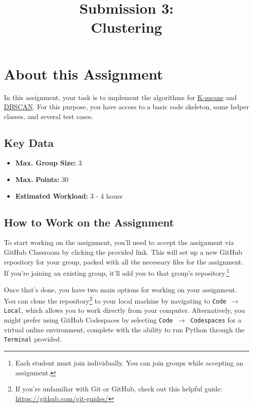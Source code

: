 \documentclass[
english,
smallborders
]{i6prcsht}
\begin{document}
\title{Submission 3: \\ Clustering}
\maketitle
\vspace*{-2cm}

\section*{About this Assignment}

In this assignment, your task is to implement the algorithms for \hyperref[sec:task-one]{K-means} and \hyperref[sec:task-two]{DBSCAN}. For this purpose, you have access to a basic code skeleton, some helper classes, and several test cases.

\subsection*{Key Data}

\begin{itemize}
	\item \textbf{Max. Group Size:} 3
	\item \textbf{Max. Points:} 30
	\item \textbf{Estimated Workload:} 3 - 4 hours
\end{itemize}

\subsection*{How to Work on the Assignment}

To start working on the assignment, you'll need to accept the assignment via GitHub Classroom by clicking the provided link. This will set up a new GitHub repository for your group, packed with all the necessary files for the assignment. If you're joining an existing group, it'll add you to that group's repository.\footnote{Each student must join individually. You can join groups while accepting an assignment.}

Once that's done, you have two main options for working on your assignment. You can clone the repository\footnote{If you're unfamiliar with Git or GitHub, check out this helpful guide: \url{https://github.com/git-guides/}} to your local machine by navigating to \texttt{Code $\rightarrow$ Local}, which allows you to work directly from your computer. Alternatively, you might prefer using GitHub Codespaces by selecting \texttt{Code $\rightarrow$ Codespaces} for a virtual online environment, complete with the ability to run Python through the \texttt{Terminal} provided.
\end{document}

